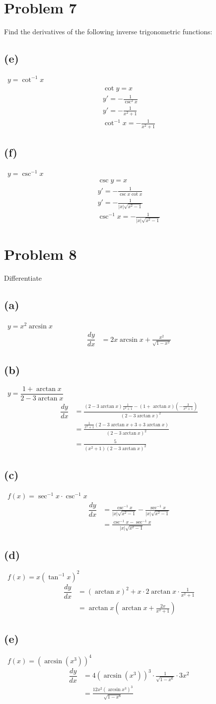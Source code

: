\documentclass[12pt]{article}
\newcommand{\dydx}{\dfrac{dy}{dx}}
\newcommand{\vem}{\vspace{0.5em}}
\newcommand{\problem}[1]{\section{Problem #1}}
\newcommand{\subproblem}[1]{\subsection{(#1)} \,}
\begin{document}
\problem{7}
Find the derivatives of the following inverse trigonometric functions: \vem

\subproblem{e}
$y=\cot^{-1} x$
\begin{gather*}
    \cot y=x\\
    y'=-\frac{1}{\csc^2 x}\\
    y'=-\frac{1}{x^2+1}\\
    \boxed{\cot^{-1} x=-\frac{1}{x^2+1}}
\end{gather*}

\subproblem{f}
$y=\csc^{-1}x$
\begin{gather*}
    \csc y=x\\
    y'=-\frac{1}{\csc x\cot x}\\
    y'=-\frac{1}{|x|\sqrt{x^2-1}}\\
    \boxed{\csc^{-1}x=-\frac{1}{|x|\sqrt{x^2-1}}}
\end{gather*}

\problem{8}
Differentiate \vem

\subproblem{a}
$y = x^2 \arcsin x$
\begin{align*}
    \dydx&=\boxed{2x\arcsin x+\frac{x^2}{\sqrt{1-x^2}}}
\end{align*}

\subproblem{b}
$y = \dfrac{1 + \arctan x}{2 - 3 \arctan x}$
\begin{align*}
    \dydx 
    &= \frac{(2-3\arctan x)\frac{1}{x^2+1}-(1+\arctan x)(-\frac{3}{x^2+1})}{(2-3\arctan x)^2}\\
    &=\frac{\frac{1}{x^2+1}(2-3\arctan x+3+3\arctan x)}{(2-3\arctan x)^2}\\
    &=\boxed{\frac{5}{(x^2+1)(2-3\arctan x)^2}}
\end{align*}

\subproblem{c}
$f(x) = \sec^{-1} x \cdot \csc^{-1} x$
\begin{align*}
    \dydx
    &=\frac{\csc^{-1} x}{|x|\sqrt{x^2-1}}-\frac{\sec^{-1} x}{|x|\sqrt{x^2-1}}\\
    &=\boxed{\frac{\csc^{-1} x-\sec^{-1} x}{|x|\sqrt{x^2-1}}}
\end{align*}

\subproblem{d}
$f(x) = x(\tan^{-1} x)^2$
\begin{align*}
    \dydx
    &=(\arctan x)^2 + x \cdot 2\arctan x\cdot \frac{1}{x^2+1}\\
    &=\boxed{\arctan x(\arctan x+\frac{2x}{x^2+1})}
\end{align*}

\subproblem{e}
$f(x) = (\arcsin(x^3))^4$
\begin{align*}
    \dydx 
    &=4 (\arcsin (x^3))^3\cdot \frac{1}{\sqrt{1-x^6}}\cdot 3x^2\\
    &=\boxed{\frac{12x^2(\arcsin x^3)^3}{\sqrt{1-x^6}}}
\end{align*}
\end{document}
